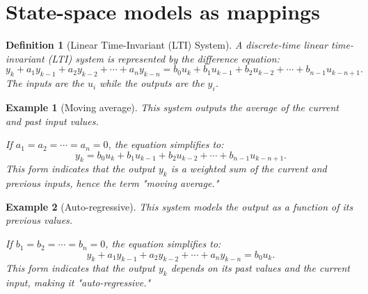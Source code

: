 \documentclass[a4 paper]{article}
\numberwithin{equation}{section}
\theoremstyle{boldStyle}
\theoremstyle{boldBlueStyle}
\theoremstyle{boldPurpleStyle}
\theoremstyle{boldRedStyle}
\newtheorem{definition}{Definition}[section]
\theoremstyle{boldGreenStyle}
\newtheorem{example}{Example}[section]
\begin{document}
\newpage
\section{State-space models as mappings}


\begin{definition}[Linear Time-Invariant (LTI) System]
  A discrete-time linear time-invariant (LTI) system is represented by the difference equation:
  \[
  y_k + a_1 y_{k-1} + a_2 y_{k-2} + \cdots + a_n y_{k-n} = b_0 u_k + b_1 u_{k-1} + b_2 u_{k-2} + \cdots + b_{n-1} u_{k-n+1}.
  \]
  The inputs are the \( u_i \) while the outputs are the \( y_i \).
\end{definition}



\begin{example}[Moving average]
  This system outputs the average of the current and past input values. 
  
  If \( a_1 = a_2 = \cdots = a_n = 0 \), the equation simplifies to:
  \[
  y_k = b_0 u_k + b_1 u_{k-1} + b_2 u_{k-2} + \cdots + b_{n-1} u_{k-n+1}.
  \]
  This form indicates that the output \( y_k \) is a weighted sum of the current and previous inputs, hence the term "moving average."
\end{example}
  
\begin{example}[Auto-regressive]
  This system models the output as a function of its previous values. 

  If \( b_1 = b_2 = \cdots = b_n = 0 \), the equation simplifies to:
  \[
  y_k + a_1 y_{k-1} + a_2 y_{k-2} + \cdots + a_n y_{k-n} = b_0 u_k.
  \]
  This form indicates that the output \( y_k \) depends on its past values and the current input, making it "auto-regressive."
\end{example}
  
\end{document}
